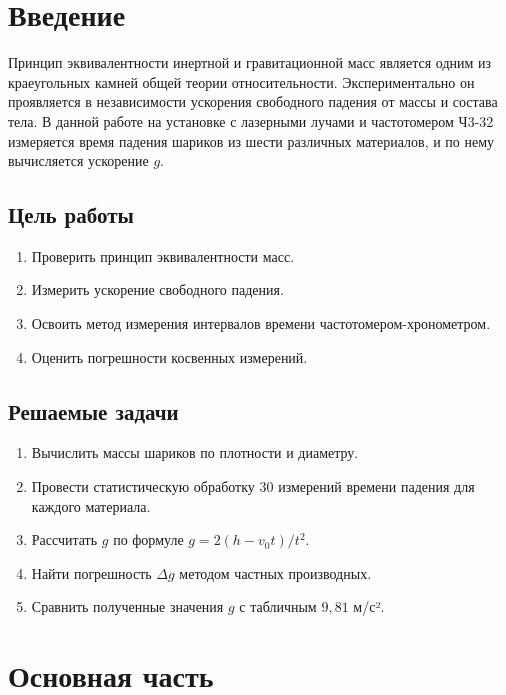 \section{Введение}
Принцип эквивалентности инертной и гравитационной масс является одним из краеугольных камней общей теории относительности. Экспериментально он проявляется в независимости ускорения свободного падения от массы и состава тела. В данной работе на установке с лазерными лучами и частотомером Ч3-32 измеряется время падения шариков из шести различных материалов, и по нему вычисляется ускорение $g$.

\subsection{Цель работы}
\begin{enumerate}
    \item Проверить принцип эквивалентности масс.
    \item Измерить ускорение свободного падения.
    \item Освоить метод измерения интервалов времени частотомером-хронометром.
    \item Оценить погрешности косвенных измерений.
\end{enumerate}

\subsection{Решаемые задачи}
\begin{enumerate}
    \item Вычислить массы шариков по плотности и диаметру.
    \item Провести статистическую обработку 30 измерений времени падения для каждого материала.
    \item Рассчитать $g$ по формуле $g = 2(h - v_0 t)/t^2$.
    \item Найти погрешность $\Delta g$ методом частных производных.
    \item Сравнить полученные значения $g$ с табличным $9,81$ м/с².
\end{enumerate}

\section{Основная часть}

